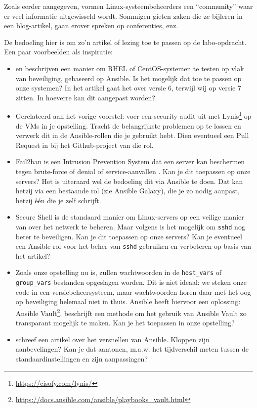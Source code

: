 Zoals eerder aangegeven, vormen Linux-systeembeheerders een ``community'' waar er veel informatie uitgewisseld wordt. Sommigen gieten zaken die ze bijleren in een blog-artikel, gaan erover spreken op conferenties, enz.

De bedoeling hier is om zo'n artikel of lezing toe te passen op de labo-opdracht. Een paar voorbeelden als inspiratie:

\begin{itemize}
  \item \textcite{Hayden2015} en \textcite{Davila2015} beschrijven een manier om RHEL of CentOS-sys\-te\-men te testen op vlak van beveiliging, gebaseerd op Ansible. Is het mogelijk dat toe te passen op onze systemen? In het artikel gaat het over versie 6, terwijl wij op versie 7 zitten. In hoeverre kan dit aangepast worden?
  \item Gerelateerd aan het vorige voorstel: voer een security-audit uit met Lynis\footnote{\url{https://cisofy.com/lynis/}} op de VMs in je opstelling. Tracht de belangrijkste problemen op te lossen en verwerk dit in de Ansible-rollen die je gebruikt hebt. Dien eventueel een Pull Request in bij het Github-project van die rol.
  \item Fail2ban is een Intrusion Prevention System dat een server kan beschermen tegen brute-force of denial of service-aanvallen \autocite{Sawiyati2014}. Kan je dit toepassen op onze servers? Het is uiteraard wel de bedoeling dit via Ansible te doen. Dat kan hetzij via een bestaande rol (zie Ansible Galaxy), die je zo nodig aanpast, hetzij één die je zelf schrijft.
  \item Secure Shell is de standaard manier om Linux-servers op een veilige manier van over het netwerk te beheren. Maar volgens \textcite{stribika2015} is het mogelijk om \texttt{sshd} nog beter te beveiligen. Kan je dit toepassen op onze servers? Kan je eventueel een Ansible-rol voor het beher van \texttt{sshd} gebruiken en verbeteren op basis van het artikel?
  \item Zoals onze opstelling nu is, zullen wachtwoorden in de \texttt{host\_vars} of \texttt{group\_vars} bestanden opgeslagen worden. Dit is niet ideaal: we steken onze code in een versiebeheersysteem, maar wachtwoorden horen daar met het oog op beveiliging helemaal niet in thuis. Ansible heeft hiervoor een oplossing: Ansible Vault\footnote{\url{https://docs.ansible.com/ansible/playbooks_vault.html}}. \textcite{Blanc2015} beschrijft een methode om het gebruik van Ansible Vault zo transparant mogelijk te maken. Kan je het toepassen in onze opstelling?
  \item \textcite{Johnson2015} schreef een artikel over het versnellen van Ansible. Kloppen zijn aanbevelingen? Kan je dat aantonen, m.a.w. het tijdverschil meten tussen de standaardinstellingen en zijn aanpassingen?
\end{itemize}

